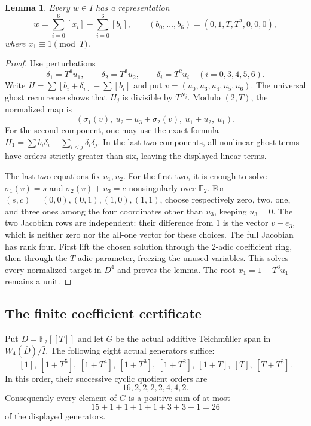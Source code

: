 \documentclass[11pt]{amsart}
\newtheorem{lemma}[theorem]{Lemma}
\theoremstyle{definition}
\numberwithin{equation}{section}
\begin{document}
\begin{lemma}\label{lem:eighth-seven-chart}
Every $w\in I$ has a representation
\[
 w=\sum_{i=0}^6[x_i]-\sum_{i=0}^6[b_i],
 \qquad (b_0,\ldots,b_6)=(0,1,T,T^2,0,0,0),
\]
where $x_1\equiv1\pmod{T}$.
\end{lemma}
\begin{proof}
Use perturbations
\[
 \delta_1=T^6u_1,\qquad\delta_2=T^3u_2,\qquad
 \delta_i=T^2u_i\quad(i=0,3,4,5,6).
\]
Write $H=\sum[b_i+\delta_i]-\sum[b_i]$ and put
$v=(u_0,u_3,u_4,u_5,u_6)$. The universal ghost recurrence shows that
$H_j$ is divisible by $T^{N_j}$. Modulo $(2,T)$, the normalized map is
\[
 \left(\sigma_1(v),\ u_2+u_3+\sigma_2(v),\ u_1+u_2,\ u_1\right).
\]
For the second component, one may use the exact formula
$H_1=\sum b_i\delta_i-\sum_{i<j}\delta_i\delta_j$.
In the last two components, all nonlinear ghost terms have orders
strictly greater than six, leaving the displayed linear terms.

The last two equations fix $u_1,u_2$. For the first two, it is enough
to solve $\sigma_1(v)=s$ and $\sigma_2(v)+u_3=c$ nonsingularly
over $\mathbb F_2$. For $(s,c)=(0,0),(0,1),(1,0),(1,1)$, choose
respectively zero, two, one, and three ones among the four coordinates
other than $u_3$, keeping $u_3=0$. The two Jacobian rows are independent:
their difference from $1$ is the vector $v+e_3$, which is neither zero
nor the all-one vector for these choices. The full Jacobian has rank
four. First lift the chosen solution through the $2$-adic coefficient
ring, then through the $T$-adic parameter, freezing the unused variables.
This solves every normalized target in $D^4$ and proves the lemma.
The root $x_1=1+T^6u_1$ remains a unit.
\end{proof}

\subsection{The finite coefficient certificate}

Put $\bar D=\mathbb F_2[[T]]$ and let $G$ be the actual additive
Teichm\"uller span in $W_4(\bar D)/\bar I$.
The following eight actual generators suffice:
\[
 [1],\ [1+T^5],\ [1+T^4],\ [1+T^3],\ [1+T^2],\
 [1+T],\ [T],\ [T+T^2].
\]
In this order, their successive cyclic quotient orders are
\[
 16,2,2,2,2,4,4,2.
\]
Consequently every element of $G$ is a positive sum of at most
\[
 15+1+1+1+1+3+3+1=26
\]
of the displayed generators.
\end{document}
